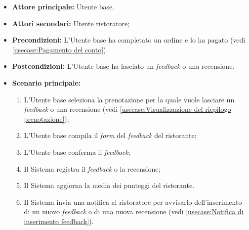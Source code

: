 \label{usecase:Inserimento di feedback e recensioni}
\begin{itemize}
	\item \textbf{Attore principale:} Utente base.

	\item \textbf{Attori secondari:} Utente ristoratore;


	\item \textbf{Precondizioni:} L'Utente base ha completato un ordine e lo ha pagato (vedi \autoref{usecase:Pagamento del conto}).

	\item \textbf{Postcondizioni:} L'Utente base ha lasciato un \textit{feedback} o una recensione.

	\item \textbf{Scenario principale:}
	      \begin{enumerate}
		      \item L'Utente base seleziona la prenotazione per la quale vuole
		            lasciare un \textit{feedback} o una recensione (vedi
		            \autoref{usecase:Visualizzazione del riepilogo prenotazione});

		      \item L'Utente base compila il \textit{form} del \textit{feedback} del ristorante;

		      \item L'Utente base conferma il \textit{feedback};

		      \item Il Sistema registra il \textit{feedback} o la recensione;

		      \item Il Sistema aggiorna la media dei punteggi del ristorante.

		      \item Il Sistema invia una notifica al ristoratore per avvisarlo
		            dell'inserimento di un nuovo \textit{feedback} o di una nuova
		            recensione (vedi \autoref{usecase:Notifica di inserimento feedback}).
	      \end{enumerate}
\end{itemize}
